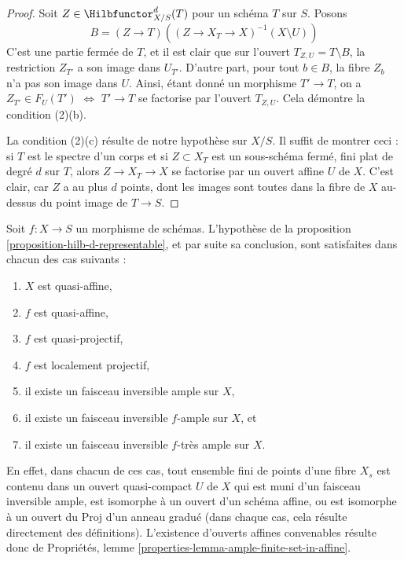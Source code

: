 \begin{proof}
\medskip\noindent
Soit $Z \in \Hilbfunctor^d_{X/S}(T)$ pour un schéma $T$ sur $S$. Posons
$$
B = (Z \to T)\left((Z \to X_T \to X)^{-1}(X \setminus U)\right)
$$
C'est une partie fermée de $T$, et il est clair que sur l'ouvert
$T_{Z, U} = T \setminus B$, la restriction $Z_{T'}$ a son image dans $U_{T'}$.
D'autre part, pour tout $b \in B$, la fibre $Z_b$ n'a pas son image
dans $U$. Ainsi, étant donné un morphisme $T' \to T$, on
a $Z_{T'} \in F_U(T')$ $\Leftrightarrow$ $T' \to T$ se factorise par
l'ouvert $T_{Z, U}$. Cela démontre la condition (2)(b).

\medskip\noindent
La condition (2)(c) résulte de notre hypothèse sur $X/S$. Il suffit de
montrer ceci : si $T$ est le spectre d'un corps
et si $Z \subset X_T$ est un sous-schéma fermé, fini plat de degré
$d$ sur $T$, alors $Z \to X_T \to X$ se factorise par un ouvert affine
$U$ de $X$. C'est clair, car $Z$ a au plus $d$ points,
dont les images sont toutes dans la fibre de $X$ au-dessus du point image
de $T \to S$.
\end{proof}

\begin{remark}
\label{remark-when-proposition-applies}
Soit $f : X \to S$ un morphisme de schémas. L'hypothèse de la
proposition \ref{proposition-hilb-d-representable}, et par
suite sa conclusion, sont satisfaites dans chacun des cas suivants :
\begin{enumerate}
\item $X$ est quasi-affine,
\item $f$ est quasi-affine,
\item $f$ est quasi-projectif,
\item $f$ est localement projectif,
\item il existe un faisceau inversible ample sur $X$,
\item il existe un faisceau inversible $f$-ample sur $X$, et
\item il existe un faisceau inversible $f$-très ample sur $X$.
\end{enumerate}
En effet, dans chacun de ces cas, tout ensemble fini de points d'une
fibre $X_s$ est contenu dans un ouvert quasi-compact $U$ de $X$
qui est muni d'un faisceau inversible ample, est isomorphe
à un ouvert d'un schéma affine, ou est isomorphe à un ouvert
du $\text{Proj}$ d'un anneau gradué (dans chaque cas, cela résulte
directement des définitions). L'existence d'ouverts affines convenables
résulte donc de
Propriétés, lemme \ref{properties-lemma-ample-finite-set-in-affine}.
\end{remark}




